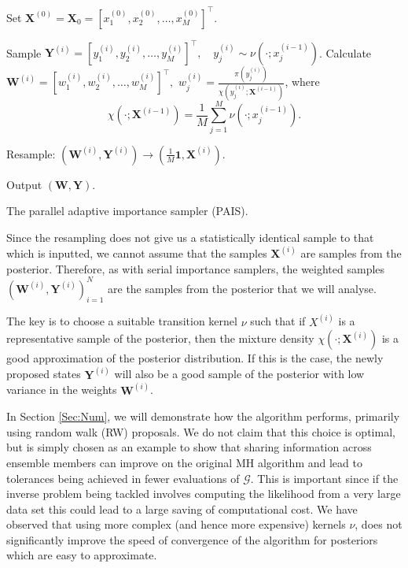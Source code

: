 \documentclass[final]{siamltex}
\newcommand{\G}{\mathcal{G}}
\newcommand{\X}{{\mathbf X}}
\newcommand{\Y}{{\mathbf Y}}
\newcommand{\W}{{\mathbf W}}
\begin{document}
\begin{table}[!h]
\centering
\begin{algorithm}[H]
\DontPrintSemicolon
\BlankLine
	Set $\X^{(0)} = \X_0 = [x_1^{(0)},x_2^{(0)},\ldots,x_M^{(0)}]^\top$.\;
	{
		Sample $\Y^{(i)} = [y_1^{(i)},y_2^{(i)},\ldots,y_M^{(i)}]^\top, \quad y_j^{(i)} \sim
\nu(\cdot;x_j^{(i-1)})$.\label{algline:PAIS_propose}\;
		Calculate $\W^{(i)} = [w_1^{(i)},w_2^{(i)},\ldots,w_M^{(i)}]^\top,$ \quad $w^{(i)}_j =
\frac{\pi(y_j^{(i)})}{\chi(y_j^{(i)};\X^{(i-1)})}$, where
		\[
			\chi(\cdot;\X^{(i-1)}) = \frac{1}{M}\sum_{j=1}^M \nu(\cdot;x_j^{(i-1)}).
		\]

		Resample: $(\W^{(i)},\Y^{(i)}) \rightarrow (\frac{1}{M}\mathbf{1}, \X^{(i)})$.\label{algline:PAIS_resample}\;
	}
	Output $(\W, \Y)$.\;
\caption{The parallel adaptive importance sampler (PAIS).\label{alg:PAIS}}
\end{algorithm}
\end{table}

Since the resampling does not give us a statistically identical sample
to that which is inputted, we cannot assume that the samples $\X^{(i)}$
are samples from the posterior. Therefore, as with serial
importance samplers, the weighted samples
$(\W^{(i)},\Y^{(i)})_{i=1}^N$ are the samples from the posterior that
we will analyse.

The key is to choose a suitable transition kernel $\nu$ such that
if $X^{(i)}$ is a representative sample of the posterior,
then the mixture density $\chi(\cdot;\X^{(i)})$ is a good
approximation of the posterior distribution. If this is the case,
the newly proposed states $\Y^{(i)}$ will also be a good sample of the
posterior with low variance in the weights $\W^{(i)}$.

In Section \ref{Sec:Num}, we will demonstrate how the algorithm
performs, primarily using random walk (RW) proposals. We do not claim that this choice is optimal, but
is simply chosen as an example to show that sharing information across
ensemble members can improve on the original MH algorithm and lead to
tolerances being achieved in fewer evaluations of $\G$. This is important since if
the inverse problem being tackled involves computing
the likelihood from a very large data set this could lead to a
large saving of computational cost. We have observed that
using more complex (and hence more expensive) kernels $\nu$, does not
significantly improve the speed of convergence of the algorithm for
posteriors which are easy to approximate\cite{Paul}.
\end{document}
